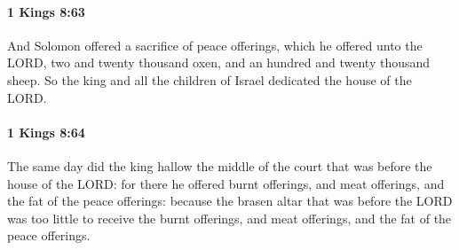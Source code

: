 		\paragraph{1 Kings 8:63} %
			\label{1KINGS-8-63}

			And Solomon offered a sacrifice of peace offerings, which he offered unto the LORD, two and twenty thousand oxen, and an hundred and twenty thousand sheep. So the king and all the children of Israel dedicated the house of the LORD.


		\paragraph{1 Kings 8:64} %
			\label{1KINGS-8-64}

			The same day did the king hallow the middle of the court that was before the house of the LORD: for there he offered burnt offerings, and meat offerings, and the fat of the peace offerings: because the brasen altar that was before the LORD was too little to receive the burnt offerings, and meat offerings, and the fat of the peace offerings.

